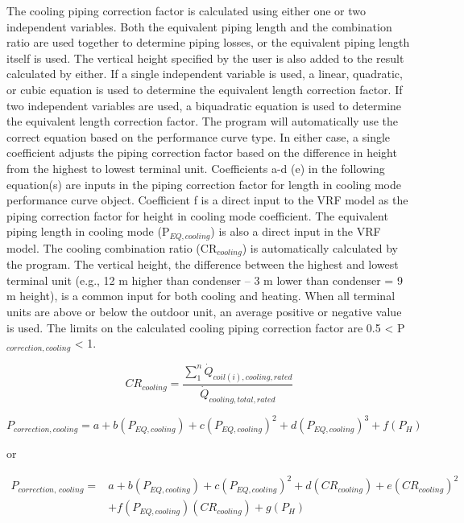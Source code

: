 The cooling piping correction factor is calculated using either one or two independent variables. Both the equivalent piping length and the combination ratio are used together to determine piping losses, or the equivalent piping length itself is used. The vertical height specified by the user is also added to the result calculated by either. If a single independent variable is used, a linear, quadratic, or cubic equation is used to determine the equivalent length correction factor. If two independent variables are used, a biquadratic equation is used to determine the equivalent length correction factor. The program will automatically use the correct equation based on the performance curve type. In either case, a single coefficient adjusts the piping correction factor based on the difference in height from the highest to lowest terminal unit. Coefficients a-d (e) in the following equation(s) are inputs in the piping correction factor for length in cooling mode performance curve object. Coefficient f is a direct input to the VRF model as the piping correction factor for height in cooling mode coefficient. The equivalent piping length in cooling mode (P\(_{EQ,cooling}\)) is also a direct input in the VRF model. The cooling combination ratio (CR\(_{cooling}\)) is automatically calculated by the program. The vertical height, the difference between the highest and lowest terminal unit (e.g., 12 m higher than condenser – 3 m lower than condenser = 9 m height), is a common input for both cooling and heating. When all terminal units are above or below the outdoor unit, an average positive or negative value is used. The limits on the calculated cooling piping correction factor are 0.5 < P\(_{correction,cooling}\) < 1.

\begin{equation}
  CR_{cooling} = \frac{\sum\limits_1^n {\dot{Q}_{coil(i),cooling,rated}}}{\dot{Q}_{cooling,total,rated}}
\end{equation}

\begin{equation}
  P_{correction,cooling} = a + b \left( P_{EQ,cooling} \right) + c \left( P_{EQ,cooling} \right)^2 + d \left( P_{EQ,cooling} \right)^3 + f \left( P_H \right)
\end{equation}

or

\begin{equation}
  \begin{array}{rl}
  P_{correction,\,cooling} =& a + b \left( P_{EQ,cooling} \right) + c \left( P_{EQ,cooling} \right)^2 + d \left( CR_{cooling} \right) + e \left( CR_{cooling} \right)^2 \\
 & + f \left( P_{EQ,cooling} \right) \left( CR_{cooling} \right) + g \left( P_H \right)
  \end{array}
\end{equation}

